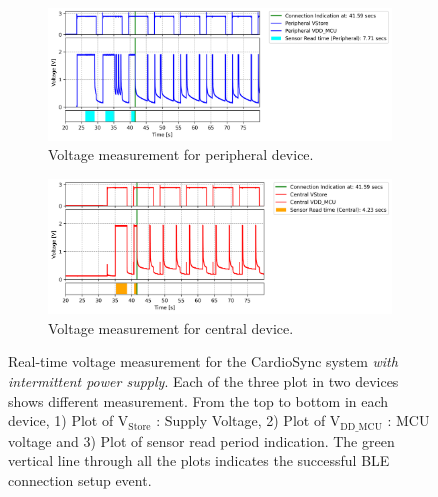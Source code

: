 \begin{figure}[ht]
    \begin{subfigure}{1\linewidth}
        \centering
        \includegraphics[width=1\linewidth]{chapters/Results/Connection_cardiosync_intermittent_peripheral.png}
        \caption{Voltage measurement for peripheral device.}
        \label{fig:intermittent_connection_cardiosync_peripheral}
        \vspace{1\baselineskip}
    \end{subfigure}
    \begin{subfigure}{1\linewidth}
        \centering
        \includegraphics[width=1\linewidth]{chapters/Results/Connection_cardiosync_intermittent_central.png}
        \caption{Voltage measurement for central device.}
        \label{fig:intermittent_connection_cardiosync_central}
    \end{subfigure}
    \caption{Real-time voltage measurement for the CardioSync system \textit{with intermittent power supply}. Each of the three plot in two devices shows different measurement. From the top to bottom in each device, 1) Plot of \(\text{V}_\text{Store}\) : Supply Voltage, 2) Plot of \(\text{V}_\text{DD\_MCU}\) : MCU voltage and 3) Plot of sensor read period indication. The green vertical line through all the plots indicates the successful BLE connection setup event.}
    \label{fig:intermittent_connection_cardiosync}
\end{figure}

